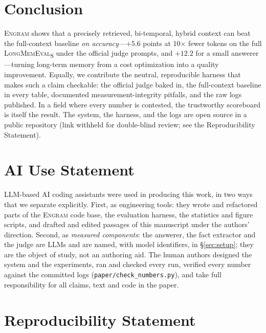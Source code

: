 \documentclass{article}
\newcommand{\engram}{\textsc{Engram}}
\newif\ifanon \ificlrfinal\anonfalse\else\anontrue\fi
\begin{document}
\section{Conclusion}

\engram{} shows that a precisely retrieved, bi-temporal, hybrid context can beat the full-context baseline
\emph{on accuracy}---$+5.6$ points at 10$\times$ fewer tokens on the full \textsc{LongMemEval}\textsubscript{S}
under the official judge prompts, and $+12.2$ for a small answerer---turning long-term memory from a cost
optimization into a quality improvement. Equally,
we contribute the neutral, reproducible harness that makes such a claim checkable: the official judge baked in,
the full-context baseline in every table, documented measurement-integrity pitfalls, and the raw logs published.
In a field where every number is contested, the trustworthy scoreboard is itself the result. The system, the
harness, and the logs are open source\ifanon{} in a public repository (link withheld for double-blind
review; see the Reproducibility Statement)\else{} at \url{https://github.com/ly-wang19/engram}\fi.

\section*{AI Use Statement}
\label{sec:aiuse}

LLM-based AI coding assistants were used in producing this work, in two ways that we separate explicitly.
First, as engineering tools: they wrote and refactored parts of the \engram{} code base, the evaluation
harness, the statistics and figure scripts, and drafted and edited passages of this manuscript under the
authors' direction. Second, as \emph{measured components}: the answerer, the fact extractor and the judge
are LLMs and are named, with model identifiers, in \S\ref{sec:setup}; they are the object of study, not an
authoring aid. The human authors designed the system and the experiments, ran and checked every run,
verified every number against the committed logs (\texttt{paper/check\_numbers.py}), and take full
responsibility for all claims, text and code in the paper.

\section*{Reproducibility Statement}
\label{sec:repro}
\end{document}
